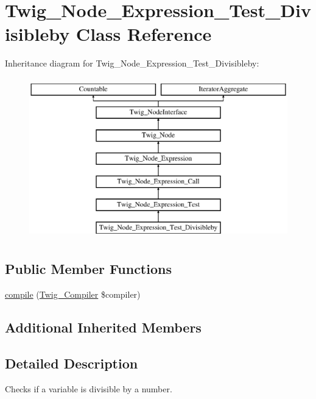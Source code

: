 \hypertarget{class_twig___node___expression___test___divisibleby}{}\section{Twig\+\_\+\+Node\+\_\+\+Expression\+\_\+\+Test\+\_\+\+Divisibleby Class Reference}
\label{class_twig___node___expression___test___divisibleby}
Inheritance diagram for Twig\+\_\+\+Node\+\_\+\+Expression\+\_\+\+Test\+\_\+\+Divisibleby\+:\begin{figure}[H]
\begin{center}
\leavevmode
\includegraphics[height=7.000000cm]{class_twig___node___expression___test___divisibleby}
\end{center}
\end{figure}
\subsection*{Public Member Functions}
\begin{DoxyCompactItemize}
\item 
\hyperlink{class_twig___node___expression___test___divisibleby_a4e0faa87c3fae583620b84d3607085da}{compile} (\hyperlink{class_twig___compiler}{Twig\+\_\+\+Compiler} \$compiler)
\end{DoxyCompactItemize}
\subsection*{Additional Inherited Members}


\subsection{Detailed Description}
Checks if a variable is divisible by a number.


